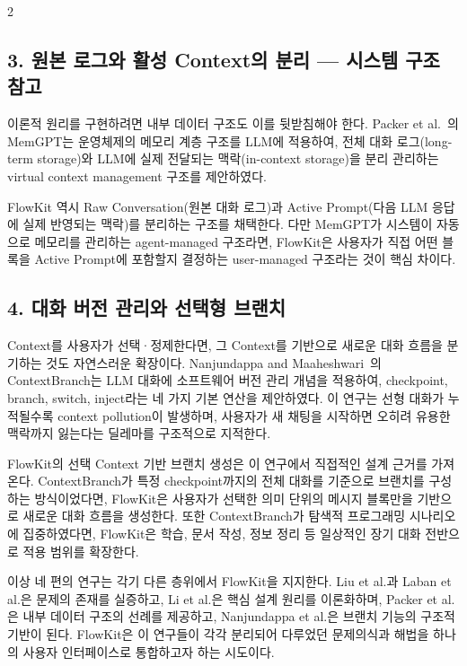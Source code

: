 \documentclass[10pt, a4paper]{article}
\begin{document}
\begin{multicols}{2}
\subsection*{3. 원본 로그와 활성 Context의 분리 — 시스템 구조 참고}

이론적 원리를 구현하려면 내부 데이터 구조도 이를 뒷받침해야 한다. Packer et al.~\cite{packer2023}의 MemGPT는 운영체제의 메모리 계층 구조를 LLM에 적용하여, 전체 대화 로그(long-term storage)와 LLM에 실제 전달되는 맥락(in-context storage)을 분리 관리하는 virtual context management 구조를 제안하였다.

FlowKit 역시 Raw Conversation(원본 대화 로그)과 Active Prompt(다음 LLM 응답에 실제 반영되는 맥락)를 분리하는 구조를 채택한다. 다만 MemGPT가 시스템이 자동으로 메모리를 관리하는 agent-managed 구조라면, FlowKit은 사용자가 직접 어떤 블록을 Active Prompt에 포함할지 결정하는 user-managed 구조라는 것이 핵심 차이다.

\subsection*{4. 대화 버전 관리와 선택형 브랜치}

Context를 사용자가 선택·정제한다면, 그 Context를 기반으로 새로운 대화 흐름을 분기하는 것도 자연스러운 확장이다. Nanjundappa and Maaheshwari~\cite{nanjundappa2025}의 ContextBranch는 LLM 대화에 소프트웨어 버전 관리 개념을 적용하여, checkpoint, branch, switch, inject라는 네 가지 기본 연산을 제안하였다. 이 연구는 선형 대화가 누적될수록 context pollution이 발생하며, 사용자가 새 채팅을 시작하면 오히려 유용한 맥락까지 잃는다는 딜레마를 구조적으로 지적한다.

FlowKit의 선택 Context 기반 브랜치 생성은 이 연구에서 직접적인 설계 근거를 가져온다. ContextBranch가 특정 checkpoint까지의 전체 대화를 기준으로 브랜치를 구성하는 방식이었다면, FlowKit은 사용자가 선택한 의미 단위의 메시지 블록만을 기반으로 새로운 대화 흐름을 생성한다. 또한 ContextBranch가 탐색적 프로그래밍 시나리오에 집중하였다면, FlowKit은 학습, 문서 작성, 정보 정리 등 일상적인 장기 대화 전반으로 적용 범위를 확장한다.

이상 네 편의 연구는 각기 다른 층위에서 FlowKit을 지지한다. Liu et al.과 Laban et al.은 문제의 존재를 실증하고, Li et al.은 핵심 설계 원리를 이론화하며, Packer et al.은 내부 데이터 구조의 선례를 제공하고, Nanjundappa et al.은 브랜치 기능의 구조적 기반이 된다. FlowKit은 이 연구들이 각각 분리되어 다루었던 문제의식과 해법을 하나의 사용자 인터페이스로 통합하고자 하는 시도이다.


\end{multicols}
\end{document}
